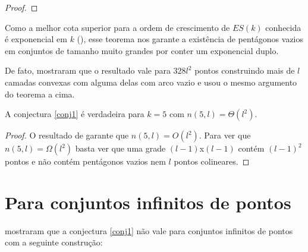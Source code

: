 \begin{proof}
\end{proof}

Como a melhor cota superior para a ordem de crescimento de $ES(k)$ conhecida é exponencial em $k$ (\cite{ESbound}), esse teorema nos garante a existência de pentágonos vazios em conjuntos de tamanho muito grandes por conter um exponencial duplo.

De fato, \cite{pentagon2} mostraram que o resultado vale para $328l^2$ pontos construindo mais de $l$ camadas convexas com alguma delas com arco vazio e usou o mesmo argumento do teorema a cima.

\begin{corolario}
    A conjectura \ref{conj1} é verdadeira para $k=5$ com $n(5,l)=\Theta(l^2)$.
\end{corolario}
\begin{proof}
    O resultado de \cite{pentagon2} garante que $n(5,l)=O(l^2)$. Para ver que $n(5,l)=\Omega(l^2)$ basta ver que uma grade $(l-1)$x$(l-1)$ contém $(l-1)^2$ pontos e não contém pentágonos vazios nem $l$ pontos colineares.
\end{proof}

\section{Para conjuntos infinitos de pontos}
\cite{infinity} mostraram que a conjectura \ref{conj1} não vale para conjuntos infinitos de pontos com a seguinte construção:

